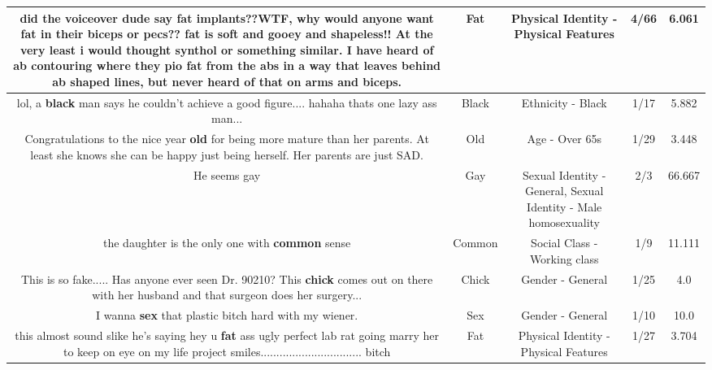\documentclass[11pt]{article}
\newlength\mylength
\begin{document}
\begin{center}
\begin{longtable}{|C{.65\mylength}|C{.30\mylength}|C{.12\mylength}|C{.12\mylength}|C{.12\mylength}|}
  \small did the voiceover dude say \textbf{fat} implants??WTF, why would anyone want \textbf{fat} in their biceps or pecs?? \textbf{fat} is soft and gooey and shapeless!! At the very least i would thought synthol or something similar. I have heard of ab contouring where they pio \textbf{fat} from the abs in a way that leaves behind ab shaped lines, but never heard of that on arms and biceps.\normalsize   & Fat & Physical Identity - Physical Features & 4/66 & 6.061 \\  \hline
  \small lol, a \textbf{black} man says he couldn't achieve a good figure.... hahaha thats one lazy ass man...\normalsize   & Black & Ethnicity - Black & 1/17 & 5.882 \\  \hline
  \small Congratulations to the nice year \textbf{old} for being more mature than her parents. At least she knows she can be happy just being herself. Her parents are just SAD.\normalsize   & Old & Age - Over 65s & 1/29 & 3.448 \\  \hline
  \small He seems gay\normalsize   & Gay & Sexual Identity - General, Sexual Identity - Male homosexuality & 2/3 & 66.667 \\  \hline
  \small the daughter is the only one with \textbf{common} sense\normalsize   & Common & Social Class - Working class & 1/9 & 11.111 \\  \hline
  \small This is so fake..... Has anyone ever seen Dr. 90210? This \textbf{chick} comes out on there with her husband and that surgeon does her surgery...\normalsize   & Chick & Gender - General & 1/25 & 4.0 \\  \hline
  \small I wanna \textbf{sex} that plastic bitch hard with my wiener.\normalsize   & Sex & Gender - General & 1/10 & 10.0 \\  \hline
  \small this almost sound slike he's saying hey u \textbf{fat} ass ugly perfect lab rat going marry her to keep on eye on my life project smiles................................ bitch\normalsize   & Fat & Physical Identity - Physical Features & 1/27 & 3.704 \\  \hline

\end{longtable}
\end{center}
\end{document}
